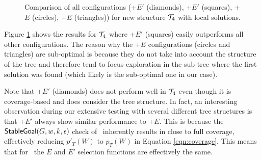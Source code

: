 \begin{figure}[ht]
\centering
{}
\caption{Comparison of all configurations (\BUL+$E'$ (diamonds), \CL+$E'$ (squares), \BUL+$E$ (circles), \CL+$E$ (triangles)) for new structure ${\mathcal{T}}_4$ with local solutions.}
\label{fig:T4_result}
\end{figure}

Figure \ref{fig:T4_result} shows the results for ${\mathcal{T}}_4$ where \CL+$E'$ (squares) easily outperforms all other configurations. The reason why the $+E$ configurations (circles and triangles) are sub-optimal is because they do not take into account the structure of the tree and therefore tend to focus exploration in the sub-tree where the first solution was found (which likely is the sub-optimal one in our case). 

Note that \BUL+$E'$ (diamonds) does not perform well in ${\mathcal{T}}_4$ even though it is coverage-based and does consider the tree structure. In fact, an interesting observation during our extensive testing with several different tree structures is that \BUL+$E'$ always show similar performance to \BUL+$E$. This is because the $\mathsf{StableGoal}(G,w,k,\epsilon)$ check of \BUL\ inherently results in close to full coverage, effectively reducing $p'_T(W)$ to $p_T(W)$ in Equation \ref{eqn:coverage}. This means that for \BUL\, the $E$ and $E'$ selection functions are effectively the same.

